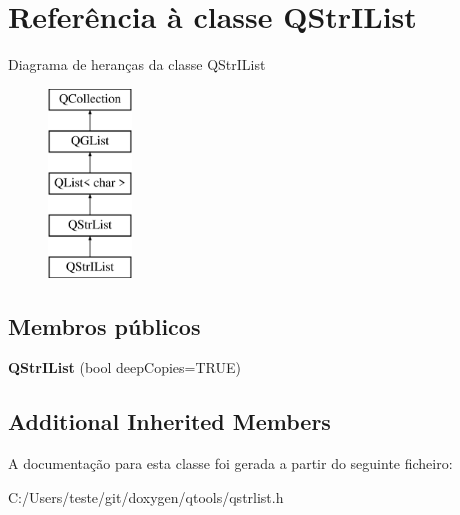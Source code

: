 \hypertarget{class_q_str_i_list}{\section{Referência à classe Q\-Str\-I\-List}
\label{class_q_str_i_list}
}
Diagrama de heranças da classe Q\-Str\-I\-List\begin{figure}[H]
\begin{center}
\leavevmode
\includegraphics[height=5.000000cm]{class_q_str_i_list}
\end{center}
\end{figure}
\subsection*{Membros públicos}
\begin{DoxyCompactItemize}
\item 
\hypertarget{class_q_str_i_list_a31956fc3afdba0f776fe6b86de60eb3a}{{\bfseries Q\-Str\-I\-List} (bool deep\-Copies=T\-R\-U\-E)}\label{class_q_str_i_list_a31956fc3afdba0f776fe6b86de60eb3a}

\end{DoxyCompactItemize}
\subsection*{Additional Inherited Members}


A documentação para esta classe foi gerada a partir do seguinte ficheiro\-:\begin{DoxyCompactItemize}
\item 
C\-:/\-Users/teste/git/doxygen/qtools/qstrlist.\-h\end{DoxyCompactItemize}
